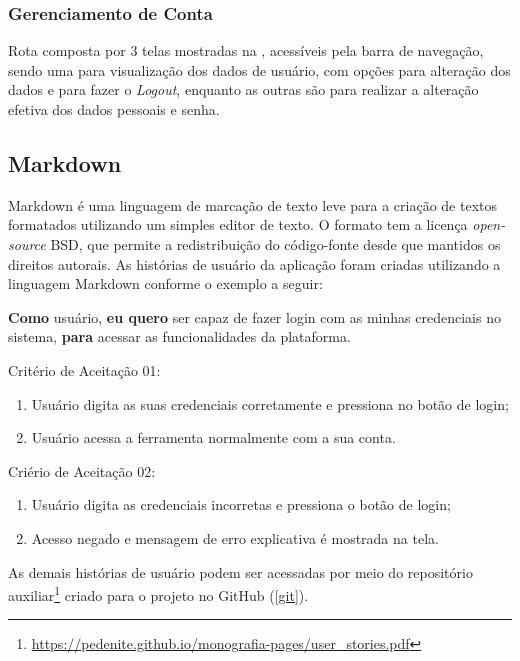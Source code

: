 \subsubsection{Gerenciamento de Conta}

Rota composta por 3 telas mostradas na , acessíveis pela barra de navegação, sendo uma para visualização dos dados de usuário, com opções para alteração dos dados e para fazer o \textit{Logout}, enquanto as outras são para realizar a alteração efetiva dos dados pessoais e senha.


\subsection{Markdown}
\label{hus}

Markdown \cite{markdown} é uma linguagem de marcação de texto leve para a criação de textos formatados utilizando um simples editor de texto. O formato tem a licença \textit{open-source} BSD, que permite a redistribuição do código-fonte desde que mantidos os direitos autorais. As histórias de usuário da aplicação foram criadas utilizando a linguagem Markdown conforme o exemplo a seguir:

\textbf{Como} usuário, 
\textbf{eu quero} ser capaz de fazer login com as minhas credenciais no sistema, 
\textbf{para} acessar as funcionalidades da plataforma.

Critério de Aceitação 01:
\begin{enumerate}
    \item Usuário digita as suas credenciais corretamente e pressiona no botão de login;
    \item Usuário acessa a ferramenta normalmente com a sua conta.
\end{enumerate}

Criério de Aceitação 02:
\begin{enumerate}
    \item Usuário digita as credenciais incorretas e pressiona o botão de login;
    \item Acesso negado e mensagem de erro explicativa é mostrada na tela.
\end{enumerate}

As demais histórias de usuário podem ser acessadas por meio do repositório auxiliar\footnote{\url{https://pedenite.github.io/monografia-pages/user_stories.pdf}} criado para o projeto no GitHub (\ref{git}).

